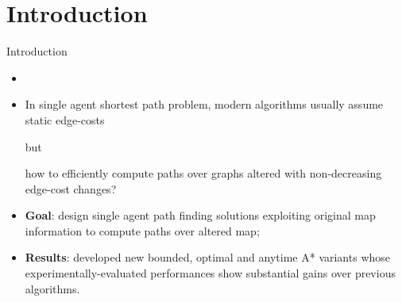 \section*{Introduction}

\begin{frame}{Introduction}
    \begin{itemize}
        \item 
        \item In single agent shortest path problem, modern algorithms usually assume static edge-costs
        
        \begin{center}
            but
        \end{center}
        
        how to efficiently compute paths over graphs altered with non-decreasing edge-cost changes?

        \item \textbf{Goal}: design single agent path finding solutions exploiting original map information to compute paths over
            altered map;
        \item \textbf{Results}: developed new bounded, optimal and anytime A* variants whose experimentally-evaluated performances show substantial gains over previous algorithms.
    \end{itemize}
\end{frame}

